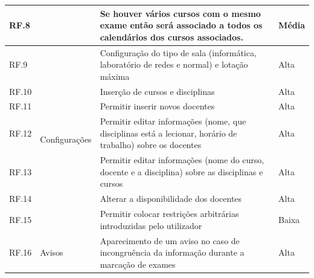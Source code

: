 \documentclass[11pt, twoside]{report}
\begin{document}
\begin{center}
\begin{longtable}{|m{1cm}|m{2.2cm}|m{10cm}|m{2cm}|}
			RF.8            &                                              & Se houver vários cursos com o mesmo exame então será associado a todos os calendários dos cursos associados.           & Média              \\
			\hline
			
			RF.9            & \multirow{7}{2cm}{Configurações}           & Configuração do tipo de sala (informática, laboratório de redes e normal) e lotação máxima                          & Alta                \\
			
			RF.10           &                                              & Inserção de cursos e disciplinas                                                                                         & Alta                \\
			
			RF.11           &                                              & Permitir inserir novos docentes                                                                                            & Alta                \\
			
			RF.12           &                                              & Permitir editar informações (nome, que disciplinas está a lecionar, horário de trabalho) sobre os docentes             & Alta                \\
			
			RF.13           &                                              & Permitir editar informações (nome do curso, docente e a disciplina) sobre as disciplinas e cursos                        & Alta                \\
			
			RF.14           &                                              & Alterar a disponibilidade dos docentes                                                                                     & Alta                \\
			
			RF.15           &                                              & Permitir colocar restrições arbitrárias introduzidas pelo utilizador                                                    & Baixa               \\
			\hline	
			
			RF.16           & \multirow{9}{2cm}{Avisos}                    & Aparecimento de um aviso no caso de incongruência da informação durante a marcação de exames                          & Alta                \\
			

\end{longtable}
\end{center}
\end{document}
